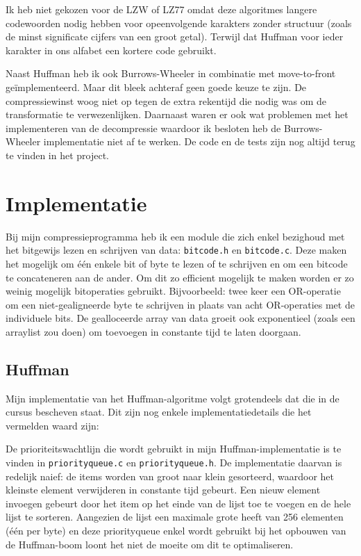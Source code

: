 \documentclass[a4paper]{article}
\begin{document}
Ik heb niet gekozen voor de LZW of LZ77 omdat deze algoritmes langere codewoorden nodig hebben voor opeenvolgende karakters zonder structuur (zoals de minst significate cijfers van een groot getal). Terwijl dat Huffman voor ieder karakter in ons alfabet een kortere code gebruikt.

Naast Huffman heb ik ook Burrows-Wheeler in combinatie met move-to-front geïmplementeerd. Maar dit bleek achteraf geen goede keuze te zijn. De compressiewinst woog niet op tegen de extra rekentijd die nodig was om de transformatie te verwezenlijken. Daarnaast waren er ook wat problemen met het implementeren van de decompressie waardoor ik besloten heb de Burrows-Wheeler implementatie niet af te werken. De code en de tests zijn nog altijd terug te vinden in het project.

\section{Implementatie}

Bij mijn compressieprogramma heb ik een module die zich enkel bezighoud met het bitgewijs lezen en schrijven van data: \texttt{bitcode.h} en \texttt{bitcode.c}. Deze maken het mogelijk om één enkele bit of byte te lezen of te schrijven en om een bitcode te concateneren aan de ander. Om dit zo efficient mogelijk te maken worden er zo weinig mogelijk bitoperaties gebruikt. Bijvoorbeeld: twee keer een OR-operatie om een niet-gealigneerde byte te schrijven in plaats van acht OR-operaties met de individuele bits. De gealloceerde array van data groeit ook exponentieel (zoals een arraylist zou doen) om toevoegen in constante tijd te laten doorgaan.

\subsection{Huffman}

Mijn implementatie van het Huffman-algoritme volgt grotendeels dat die in de cursus bescheven staat. Dit zijn nog enkele implementatiedetails die het vermelden waard zijn:

De prioriteitswachtlijn die wordt gebruikt in mijn Huffman-implementatie is te vinden in \texttt{priorityqueue.c} en \texttt{priorityqueue.h}. De implementatie daarvan is redelijk naief: de items worden van groot naar klein gesorteerd, waardoor het kleinste element verwijderen in constante tijd gebeurt. Een nieuw element invoegen gebeurt door het item op het einde van de lijst toe te voegen en de hele lijst te sorteren. Aangezien de lijst een maximale grote heeft van 256 elementen (één per byte) en deze priorityqueue enkel wordt gebruikt bij het opbouwen van de Huffman-boom loont het niet de moeite om dit te optimaliseren.
\end{document}
